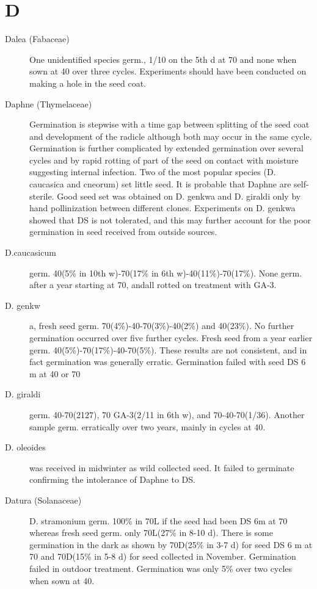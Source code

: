 \section{D}
\begin{description}

\item[Dalea (Fabaceae)] One unidentified species germ., 1/10 on the 5th d at 70
and none when sown at 40 over three cycles. Experiments should have been
conducted on making a hole in the seed coat.

\item[Daphne (Thymelaceae)] Germination is stepwise with a time gap between
splitting of the seed coat and development of the radicle although both may occur in
the same cycle. Germination is further complicated by extended germination over
several cycles and by rapid rotting of part of the seed on contact with moisture
suggesting internal infection. Two of the most popular species (D. caucasica and
cneorum) set little seed. It is probable that Daphne are self-sterile. Good seed set was
obtained on D. genkwa and D. giraldi only by hand pollinization between different
clones. Experiments on D. genkwa showed that DS is not tolerated, and this may
further account for the poor germination in seed received from outside sources.
\item[D.caucasicum] germ. 40(5\% in 10th w)-70(17\% in 6th w)-40(11\%)-70(17\%).
None germ. after a year starting at 70, andall rotted on treatment with GA-3.
\item[D. genkw]a, fresh seed germ. 70(4\%)-40-70(3\%)-40(2\%) and 40(23\%). No
further germination occurred over five further cycles. Fresh seed from a year earlier
germ. 40(5\%)-70(17\%)-40-70(5\%). These results are not consistent, and in fact
germination was generally erratic. Germination failed with seed DS 6 m at 40 or 70
\item[D. giraldi] germ. 40-70(2127), 70 GA-3(2/11 in 6th w), and 70-40-70(1/36).
Another sample germ. erratically over two years, mainly in cycles at 40.
\item[D. oleoides] was received in midwinter as wild collected seed. It failed to
germinate confirming the intolerance of Daphne to DS.

\item[Datura (Solanaceae)] D. stramonium germ. 100\% in 70L if the seed had
been DS 6m at 70 whereas fresh seed germ. only 70L(27\% in 8-10 d). There is some
germination in the dark as shown by 70D(25\% in 3-7 d) for seed DS 6 m at 70 and
70D(15\% in 5-8 d) for seed collected in November. Germination failed in outdoor
treatment. Germination was only 5\% over two cycles when sown at 40.


\end{description}

